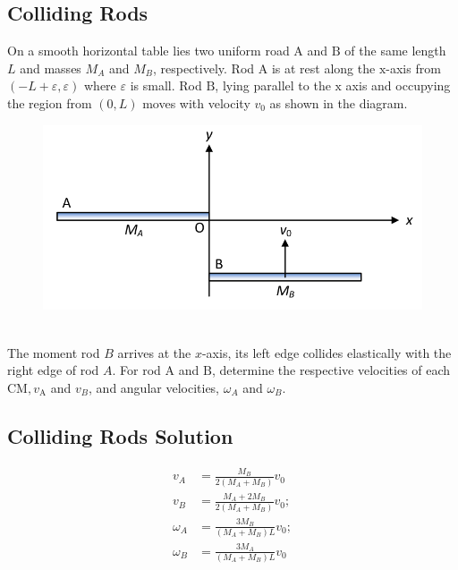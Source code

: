 \documentclass{article}
\begin{document}
\subsection{Colliding Rods }
On a smooth horizontal table lies two uniform road $\mathrm{A}$ and $\mathrm{B}$ of the same length $L$ and masses $M_A$ and $M_B$, respectively. Rod $\mathrm{A}$ is at rest along the $\mathrm{x}$-axis from $(-L+\varepsilon, \varepsilon)$ where $\varepsilon$ is small. Rod $\mathrm{B}$, lying parallel to the $\mathrm{x}$ axis and occupying the region from $(0, L)$ moves with velocity $v_0$ as shown in the diagram.
\begin{figure}[h]
    \centering
\includegraphics[width=0.6\linewidth]{images/collidingrods.png}
\end{figure}\\
The moment rod $B$ arrives at the $x$-axis, its left edge collides elastically with the right edge of rod $A$. For rod $\mathrm{A}$ and $\mathrm{B}$, determine the respective velocities of each $\mathrm{CM}, v_{\mathrm{A}}$ and $v_B$, and angular velocities, $\omega_A$ and $\omega_B$.

\clearpage
\subsection{Colliding Rods Solution}
\begin{align}
v_A &=\frac{M_B}{2\left(M_A+M_B\right)} v_0 \\
v_B &=\frac{M_A+2 M_B}{2\left(M_A+M_B\right)} v_0 ; \\
\omega_A &=\frac{3 M_B}{\left(M_A+M_B\right) L} v_0 ; \\
\omega_B &=\frac{3 M_A}{\left(M_A+M_B\right) L} v_0
\end{align}
\clearpage
\end{document}
